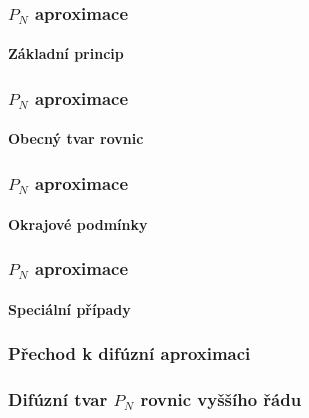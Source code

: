 \begin{frame}
  \frametitle{$P_N$ aproximace}
  \framesubtitle{Základní princip}  


\end{frame}

\begin{frame}
  \frametitle{$P_N$ aproximace}
  \framesubtitle{Obecný tvar rovnic}  


\end{frame}

\begin{frame}
  \frametitle{$P_N$ aproximace}
  \framesubtitle{Okrajové podmínky}  


\end{frame}

\begin{frame}
  \frametitle{$P_N$ aproximace}
  \framesubtitle{Speciální případy}  


\end{frame}

\begin{frame}
  \frametitle{Přechod k difúzní aproximaci}


\end{frame}

\begin{frame}
  \frametitle{Difúzní tvar $P_N$ rovnic vyššího řádu}


\end{frame}

